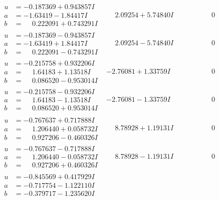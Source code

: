 \documentclass[1p]{elsarticle_modified}
\theoremstyle{definition}
\begin{document}
$$\begin{array}{c|c|c}
\begin{aligned}
u &= -0.187369 + 0.943857 I \\
a &= -1.63419 - 1.84417 I \\
b &= \phantom{-}0.222091 + 0.743291 I\end{aligned}
 & \phantom{-}2.09254 + 5.74840 I & \phantom{-0.000000 } 0 \\ \hline\begin{aligned}
u &= -0.187369 - 0.943857 I \\
a &= -1.63419 + 1.84417 I \\
b &= \phantom{-}0.222091 - 0.743291 I\end{aligned}
 & \phantom{-}2.09254 - 5.74840 I & \phantom{-0.000000 } 0 \\ \hline\begin{aligned}
u &= -0.215758 + 0.932206 I \\
a &= \phantom{-}1.64183 + 1.13518 I \\
b &= \phantom{-}0.086520 - 0.953014 I\end{aligned}
 & -2.76081 + 1.33759 I & \phantom{-0.000000 } 0 \\ \hline\begin{aligned}
u &= -0.215758 - 0.932206 I \\
a &= \phantom{-}1.64183 - 1.13518 I \\
b &= \phantom{-}0.086520 + 0.953014 I\end{aligned}
 & -2.76081 - 1.33759 I & \phantom{-0.000000 } 0 \\ \hline\begin{aligned}
u &= -0.767637 + 0.717888 I \\
a &= \phantom{-}1.206440 + 0.058732 I \\
b &= \phantom{-}0.927206 - 0.460326 I\end{aligned}
 & \phantom{-}8.78928 + 1.19131 I & \phantom{-0.000000 } 0 \\ \hline\begin{aligned}
u &= -0.767637 - 0.717888 I \\
a &= \phantom{-}1.206440 - 0.058732 I \\
b &= \phantom{-}0.927206 + 0.460326 I\end{aligned}
 & \phantom{-}8.78928 - 1.19131 I & \phantom{-0.000000 } 0 \\ \hline\begin{aligned}
u &= -0.845569 + 0.417929 I \\
a &= -0.717754 - 1.122110 I \\
b &= -0.379717 - 1.235620 I\end{aligned}

\end{array}$$
\end{document}
